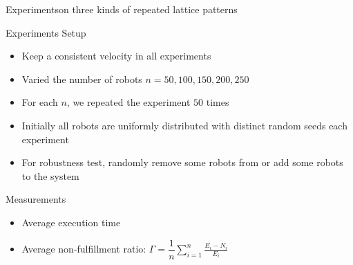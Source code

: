\documentclass[10pt]{beamer}
\begin{document}
\begin{frame}{Experiments}{on three kinds of repeated
lattice patterns}
  \begin{block}{Experiments Setup}
    \begin{itemize}
    \item Keep a consistent velocity in all experiments
    \item Varied the number of robots $n=50, 100, 150, 200, 250$
    \item For each $n$, we repeated the experiment $50$ times
    \item Initially all robots are uniformly distributed with distinct
      random seeds each experiment
    \item For robustness test, randomly remove some robots from or add
      some robots to the system
    \end{itemize}
  \end{block}
  \begin{block}{Measurements}
    \begin{itemize}
    \item Average execution time
    \item Average non-fulfillment ratio: $\Gamma =
      \dfrac{1}{n}\sum\limits_{i=1}^n \frac{E_i - N_i}{E_i}$
    \end{itemize}
  \end{block}
\end{frame}
\end{document}
